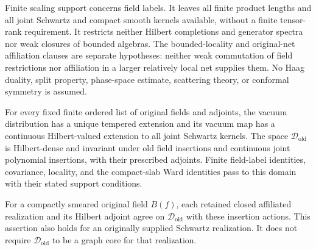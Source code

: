 Finite scaling support concerns field labels. It leaves all finite product
lengths and all joint Schwartz and compact smooth kernels available,
without a finite tensor-rank requirement. It restricts neither Hilbert
completions and generator spectra nor weak closures of bounded algebras.
The bounded-locality and original-net affiliation clauses are separate
hypotheses: neither weak commutation of field restrictions nor affiliation
in a larger relatively local net supplies them. No Haag duality, split
property, phase-space estimate, scattering theory, or conformal symmetry
is assumed.

\begin{proposition}\label{F:old-domain}
For every fixed finite ordered list of original fields and adjoints,
the vacuum distribution has a unique tempered extension and its vacuum
map has a continuous Hilbert-valued extension to all joint Schwartz
kernels. The space $\mathcal D_{\mathrm{old}}$ is Hilbert-dense and
invariant under old field insertions and continuous joint polynomial
insertions, with their prescribed adjoints. Finite field-label
identities, covariance, locality, and the compact-slab Ward identities
pass to this domain with their stated support conditions.

For a compactly smeared original field $B(f)$, each retained closed
affiliated realization and its Hilbert adjoint agree on
$\mathcal D_{\mathrm{old}}$ with these insertion actions. This assertion
also holds for an originally supplied Schwartz realization. It does
not require $\mathcal D_{\mathrm{old}}$ to be a graph core for that
realization.
\end{proposition}

